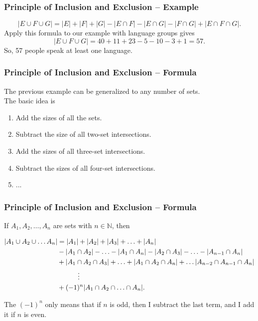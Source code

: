 \documentclass[aspectratio=169,11pt,usenames,dvipsnames,handout]{beamer}
\begin{document}
\begin{frame}
 \frametitle{Principle of Inclusion and Exclusion -- Example}
 \[
  |E \cup F \cup G| = |E| + |F| + |G| - |E \cap F| - |E \cap G| - |F \cap G| +
  |E \cap F \cap G|.
 \]
 Apply this formula to our example with language groups gives
 \[
  |E \cup F \cup G| = 40 + 11 + 23 - 5 - 10 - 3 + 1 = 57.
 \]
 \pause
 So, 57 people speak at least one language.
\end{frame}

\begin{frame}
 \frametitle{Principle of Inclusion and Exclusion -- Formula}
 The previous example can be generalized to any number of sets.\pause\\
 The basic idea is
 \begin{enumerate}
  \item Add the sizes of all the sets.\pause
  \item Subtract the size of all two-set intersections.\pause
  \item Add the sizes of all three-set intersections.\pause
  \item Subtract the sizes of all four-set intersections.\pause
  \item ...
 \end{enumerate}
\end{frame}

\begin{frame}
 \frametitle{Principle of Inclusion and Exclusion -- Formula}
 If $A_1,A_2,\ldots,A_n$ are sets with $n \in \mathbb{N}$, then
 \begin{tcolorbox}[top=-\parskip,title=Principle of Inclusion and Exclusion]
  \begin{align*}
   |A_1 \cup A_2 \cup \ldots A_n| &= |A_1| + |A_2| + |A_3| + \ldots + |A_n|\\
                                  &- |A_1 \cap A_2| - \ldots - |A_1 \cap A_n| -
                                  |A_2 \cap A_3| - \ldots - |A_{n-1} \cap A_n|\\
                                  &+ |A_1 \cap A_2 \cap A_3| + \ldots + |A_1
                                  \cap A_2 \cap A_n| + \ldots |A_{n-2} \cap
                                  A_{n-1} \cap A_n|\\
                                  & \hspace*{3em} \vdots \\
                                  & + (-1)^{n} |A_1 \cap A_2 \cap \ldots \cap
                                  A_n|.
  \end{align*}
 \end{tcolorbox}
 \pause
 The $(-1)^{n}$ only means that if $n$ is odd, then I subtract the last term,
 and I add it if $n$ is even.
\end{frame}
\end{document}
